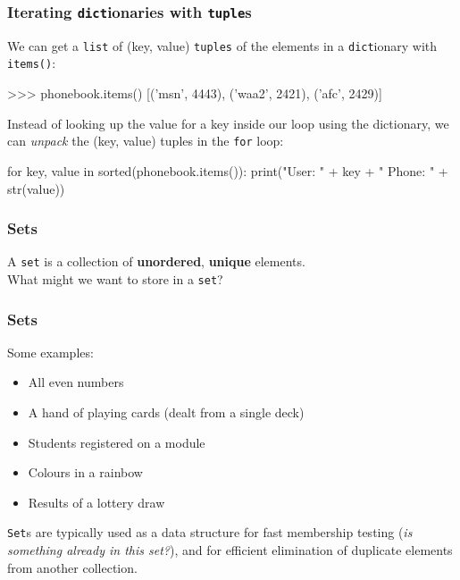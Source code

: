 \documentclass{beamer}
\begin{document}
\begin{frame}[fragile]
\frametitle{Iterating \texttt{dict}ionaries with \texttt{tuple}s}
We can get a \texttt{list} of (key, value) \texttt{tuples} of the elements
in a \texttt{dict}ionary with \texttt{items()}:
\begin{code}
>>> phonebook.items()
[('msn', 4443), ('waa2', 2421), ('afc', 2429)]
\end{code}

\vskip 0.3cm
Instead of looking up the value for a key inside our loop using the dictionary,
we can \textit{unpack} the (key, value) tuples in the \texttt{for} loop:
\begin{code}
for key, value in sorted(phonebook.items()):
    print("User: " + key + " Phone: " + str(value))
\end{code}
\end{frame}

\begin{frame}[fragile]
\frametitle{Sets}
    A \texttt{set} is a collection of \textbf{unordered}, \textbf{unique} elements.\\
    \bigskip
    What might we want to store in a \texttt{set}?
\end{frame}
\begin{frame}[fragile]
\frametitle{Sets}
    Some examples:

    \begin{itemize}
        \item All even numbers
        \item A hand of playing cards (dealt from a single deck)
        \item Students registered on a module
        \item Colours in a rainbow
        \item Results of a lottery draw
    \end{itemize}

    \texttt{Set}s are typically used as a data structure for fast 
    membership testing (\textit{is something already in this set?}), and for
    efficient elimination of duplicate elements from another collection.
\end{frame}
\end{document}
